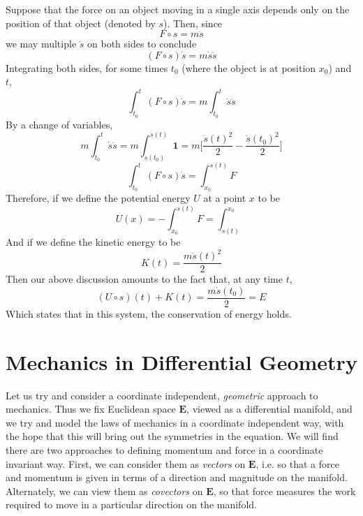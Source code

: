 Suppose that the force on an object moving in a single axis depends only on the position of that object (denoted by $s$). Then, since
%
\[ F \circ s = m \ddot{s} \]
%
we may multiple $\dot{s}$ on both sides to conclude
%
\[ (F \circ s) \dot{s} = m \dot{s} \ddot{s} \]
%
Integrating both sides, for some times $t_0$ (where the object is at position $x_0$) and $t$,
%
\[ \int_{t_0}^{t} (F \circ s) \dot{s} = m \int_{t_0}^{t} \dot{s} \ddot{s} \]
%
By a change of variables,
%
\[ m \int_{t_0}^{t} \dot{s} \ddot{s} = m \int_{\dot{s}(t_0)}^{\dot{s}(t)} \mathbf{1} = m \bigg[ \frac{\dot{s}(t)^2}{2} - \frac{\dot{s}(t_0)^2}{2} \bigg] \]
%
\[ \int_{t_0}^{t} (F \circ s) \dot{s} = \int_{x_0}^{s(t)} F \]
%
Therefore, if we define the potential energy $U$ at a point $x$ to be
%
\[ U(x) = - \int_{x_0}^{s(t)} F = \int_{s(t)}^{x_0} \]
%
And if we define the kinetic energy to be
%
\[ K(t) = \frac{m\dot{s}(t)^2}{2} \]
%
Then our above discussion amounts to the fact that, at any time $t$,
%
\[ (U \circ s)(t) + K(t) = \frac{m\dot{s}(t_0)}{2} = E \]
%
Which states that in this system, the conservation of energy holds.










\chapter{Mechanics in Differential Geometry}

Let us try and consider a coordinate independent, \emph{geometric} approach to mechanics. Thus we fix Euclidean space $\mathbf{E}$, viewed as a differential manifold, and we try and model the laws of mechanics in a coordinate independent way, with the hope that this will bring out the symmetries in the equation. We will find there are two approaches to defining momentum and force in a coordinate invariant way. First, we can consider them as \emph{vectors} on $\mathbf{E}$, i.e. so that a force and momentum is given in terms of a direction and magnitude on the manifold. Alternately, we can view them as \emph{covectors} on $\mathbf{E}$, so that force measures the work required to move in a particular direction on the manifold.

